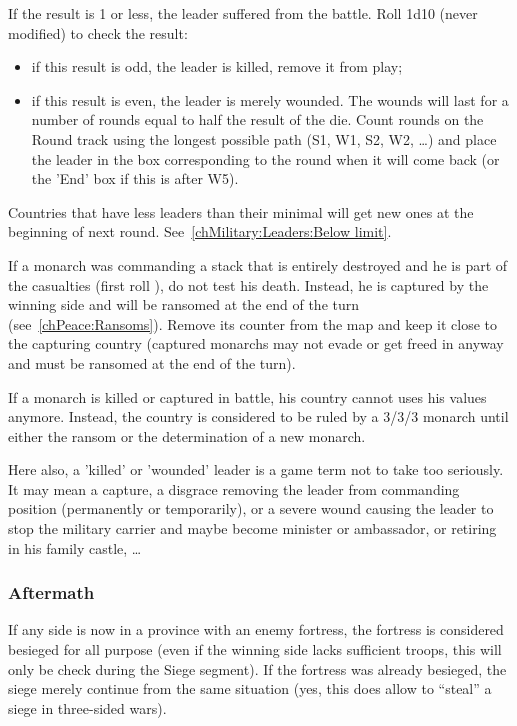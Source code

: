 If the result is 1 or less, the leader suffered from the battle. Roll 1d10
(never modified) to check the result:
\begin{itemize}
\item if this result is odd, the leader is killed, remove it from play;
\item if this result is even, the leader is merely wounded. The wounds will
  last for a number of rounds equal to half the result of the die. Count
  rounds on the Round track using the longest possible path (S1, W1, S2, W2,
  \ldots) and place the leader in the box corresponding to the round when it
  will come back (or the 'End' box if this is after W5).
\end{itemize}

Countries that have less leaders than their minimal will get new ones at the
beginning of next round. See~\ref{chMilitary:Leaders:Below limit}.

If a monarch was commanding a stack that is entirely destroyed and he is part
of the casualties (first roll ), do not test his death. Instead, he is
captured by the winning side and will be ransomed at the end of the
turn (see~\ref{chPeace:Ransoms}). Remove its counter from the map and keep it
close to the capturing country (captured monarchs may not evade or get freed
in anyway and must be ransomed at the end of the turn).

If a monarch is killed or captured in battle, his country cannot uses his
values anymore. Instead, the country is considered to be ruled by a 3/3/3
monarch until either the ransom or the determination of a new monarch.

\begin{designnote}
  Here also, a 'killed' or 'wounded' leader is a game term not to take too
  seriously. It may mean a capture, a disgrace removing the leader from
  commanding position (permanently or temporarily), or a severe wound causing
  the leader to stop the military carrier and maybe become minister or
  ambassador, or retiring in his family castle, \ldots
\end{designnote}

\subsubsection{Aftermath}
\label{chMilitary:Battle:Cleanup:Aftermath}
If any side is now in a province with an enemy fortress, the fortress is
considered besieged for all purpose (even if the winning side lacks sufficient
troops, this will only be check during the Siege segment). If the fortress was
already besieged, the siege merely continue from the same situation (yes, this
does allow to ``steal'' a siege in three-sided wars).

